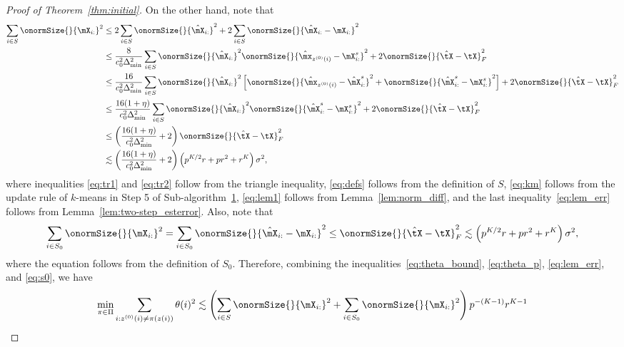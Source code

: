\documentclass[lettersize,onecolumn,journal]{IEEEtran}
\theoremstyle{definition}
\theoremstyle{definition}
\newcommand{\of}[1]{\left(#1\right)}
\newcommand{\off}[1]{\left[#1\right]}
\begin{document}
\begin{proof}[Proof of Theorem~\ref{thm:initial}]
    On the other hand, note that 
    \begin{align}
         \sum_{i \in S} \onormSize{}{\mX_{i:}}^2 & \leq 2 \sum_{i \in S} \onormSize{}{\hat \mX_{i:}}^2  +  2\sum_{i \in S} \onormSize{}{\hat \mX_{i:} - \mX_{i:}}^2 \label{eq:tr1}\\
         & \leq \frac{8}{c_0^2 \Delta_{\min}^2  } \sum_{i \in S} \onormSize{}{\hat \mX_{i:}}^2   \onormSize{}{\hat \mx_{z^{(0)}(i)} - \mX_{i:}^s }^2 +2 \onormSize{}{\hat \tX - \tX}_F^2 \label{eq:defs} \\
         & \leq \frac{16}{c_0^2 \Delta_{\min}^2  }\sum_{i \in S} \onormSize{}{\hat \mX_{i:}}^2  \off{ \onormSize{}{\hat \mx_{z^{(0)}(i)} - \hat \mX_{i:}^s }^2 + \onormSize{}{\hat \mX_{i:}^s - \mX_{i:}^s }^2 } + 2\onormSize{}{\hat \tX - \tX}_F^2 \label{eq:tr2} \\
         & \leq  \frac{16(1 + \eta)}{c_0^2 \Delta_{\min}^2 }\sum_{i \in S} \onormSize{}{\hat \mX_{i:}}^2  \onormSize{}{\hat \mX_{i:}^s - \mX_{i:}^s }^2  + 2\onormSize{}{\hat \tX - \tX}_F^2 \label{eq:km} \\
         & \leq \of{ \frac{16(1 + \eta)}{c_0^2 \Delta_{\min}^2 } + 2 }\onormSize{}{\hat \tX - \tX}_F^2 \label{eq:lem1}\\
         & \lesssim \of{ \frac{16(1 + \eta)}{c_0^2 \Delta_{\min}^2 } + 2 } \of{ p^{K/2}r + pr^2 + r^K } \sigma^2 \label{eq:lem_err},
    \end{align}
    where inequalities \eqref{eq:tr1} and \eqref{eq:tr2} follow from the triangle inequality, \eqref{eq:defs} follows from the definition of $S$, \eqref{eq:km} follows from the update rule of $k$-means in Step 5 of Sub-algorithm~\hyperref[alg:main]{1}, \eqref{eq:lem1} follows from Lemma~\ref{lem:norm_diff}, and the last inequality~\eqref{eq:lem_err} follows from Lemma~\ref{lem:two-step_esterror}. Also, note that 
    \begin{equation}\label{eq:s0}
         \sum_{i \in S_0} \onormSize{}{\mX_{i:}}^2 =  \sum_{i \in S_0} \onormSize{}{\hat \mX_{i:}- \mX_{i:}}^2 \leq \onormSize{}{\hat \tX - \tX}_F^2 \lesssim \of{ p^{K/2}r + pr^2 + r^K } \sigma^2,
    \end{equation}
    where the equation follows from the definition of $S_0$. Therefore, combining the inequalities~\eqref{eq:theta_bound}, \eqref{eq:theta_p}, \eqref{eq:lem_err}, and \eqref{eq:s0}, we have 
    \begin{align}
        \min_{\pi \in \Pi} \sum_{i : z^{(0)}(i) \neq \pi(z(i))} \theta(i)^2  &\lesssim \of{\sum_{i \in S} \onormSize{}{\mX_{i:}}^2 + \sum_{i \in S_0} \onormSize{}{\mX_{i:}}^2  } p^{-(K-1)} r^{K-1} \\

\end{align}
\end{proof}
\end{document}
